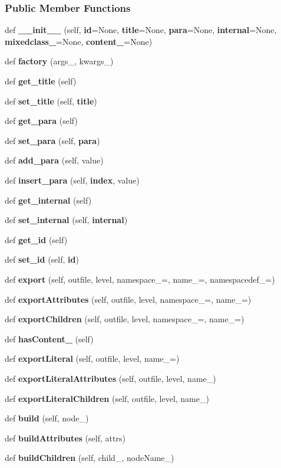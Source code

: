 \subsubsection*{Public Member Functions}
\begin{DoxyCompactItemize}
\item 
def {\bf \+\_\+\+\_\+init\+\_\+\+\_\+} (self, {\bf id}=None, {\bf title}=None, {\bf para}=None, {\bf internal}=None, {\bf mixedclass\+\_\+}=None, {\bf content\+\_\+}=None)
\item 
def {\bf factory} (args\+\_\+, kwargs\+\_\+)
\item 
def {\bf get\+\_\+title} (self)
\item 
def {\bf set\+\_\+title} (self, {\bf title})
\item 
def {\bf get\+\_\+para} (self)
\item 
def {\bf set\+\_\+para} (self, {\bf para})
\item 
def {\bf add\+\_\+para} (self, value)
\item 
def {\bf insert\+\_\+para} (self, {\bf index}, value)
\item 
def {\bf get\+\_\+internal} (self)
\item 
def {\bf set\+\_\+internal} (self, {\bf internal})
\item 
def {\bf get\+\_\+id} (self)
\item 
def {\bf set\+\_\+id} (self, {\bf id})
\item 
def {\bf export} (self, outfile, level, namespace\+\_\+=\textquotesingle{}\textquotesingle{}, name\+\_\+=\textquotesingle{}, namespacedef\+\_\+=\textquotesingle{}\textquotesingle{})
\item 
def {\bf export\+Attributes} (self, outfile, level, namespace\+\_\+=\textquotesingle{}\textquotesingle{}, name\+\_\+=\textquotesingle{})
\item 
def {\bf export\+Children} (self, outfile, level, namespace\+\_\+=\textquotesingle{}\textquotesingle{}, name\+\_\+=\textquotesingle{})
\item 
def {\bf has\+Content\+\_\+} (self)
\item 
def {\bf export\+Literal} (self, outfile, level, name\+\_\+=\textquotesingle{})
\item 
def {\bf export\+Literal\+Attributes} (self, outfile, level, name\+\_\+)
\item 
def {\bf export\+Literal\+Children} (self, outfile, level, name\+\_\+)
\item 
def {\bf build} (self, node\+\_\+)
\item 
def {\bf build\+Attributes} (self, attrs)
\item 
def {\bf build\+Children} (self, child\+\_\+, node\+Name\+\_\+)
\end{DoxyCompactItemize}

